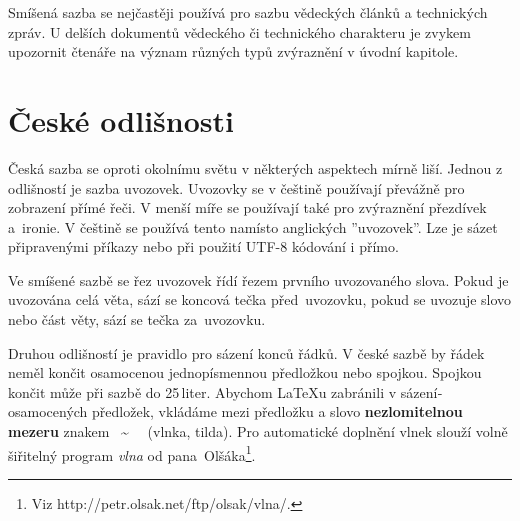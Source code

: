 \documentclass[11pt,twocolumn,a4paper]{article}
\begin{document}
Smíšená sazba se nejčastěji používá pro sazbu vědeckých článků a technických zpráv. U delší­ch dokumentů vědeckého či technického charakteru je zvykem upozornit čtenáře na význam různých typů zvýraznění­ v úvodní­ kapitole.

\section{České odlišnosti}

Česká sazba se oproti okolní­mu světu v některých aspektech mí­rně liší­. Jednou z odlišností je sazba uvozovek. Uvozovky se v češtině použí­vají­ převážně pro zobrazení­ pří­mé řeči. V menší­ míře se použí­vají­ také pro zvýraznění­ přezdí­vek a~ironie. V češtině se použí­vá tento \textbf{} namí­sto anglických ''uvozovek''. Lze je sázet připravenými příkazy nebo při použití UTF-8 kódování i přímo.

Ve smíšené sazbě se řez uvozovek ří­dí­ řezem první­ho uvozovaného slova. Pokud je uvozována celá věta, sází­ se koncová tečka před~uvozovku, pokud se uvozuje slovo nebo část věty, sází­ se tečka za~uvozovku. 

Druhou odlišností je pravidlo pro sázení­ konců řádků. V české sazbě by řádek neměl končit osamocenou jednopí­smennou předložkou nebo spojkou. Spojkou  končit může při sazbě do 25\,liter. Abychom \LaTeX u zabránili v sázení­ osamocených předložek, vkládáme mezi předložku a slovo \textbf{nezlomitelnou mezeru} znakem ~\~ ~~(vlnka, tilda). Pro automatické doplnění vlnek slouží­ volně šiřitelný program \emph{vlna} od pana~Olšáka\footnote{Viz http://petr.olsak.net/ftp/olsak/vlna/.}.
\end{document}
